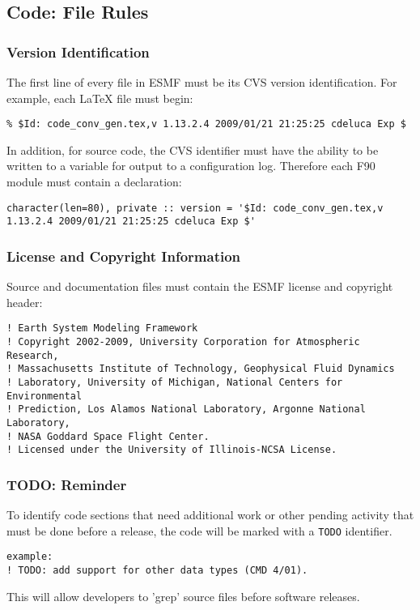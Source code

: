 \subsection{Code: File Rules} 

\subsubsection{Version Identification} 
The first line of every file in ESMF
  must be its CVS version identification. For example, each \LaTeX
  file must begin:
\begin{verbatim}
% $Id: code_conv_gen.tex,v 1.13.2.4 2009/01/21 21:25:25 cdeluca Exp $ 
\end{verbatim}

In addition, for source code, the CVS identifier must have the 
ability to be written to a variable for output to a configuration log.  
Therefore each F90 module must contain a declaration:
\begin{verbatim}
character(len=80), private :: version = '$Id: code_conv_gen.tex,v 1.13.2.4 2009/01/21 21:25:25 cdeluca Exp $'
\end{verbatim}

\subsubsection{License and Copyright Information}

Source and documentation files must contain the ESMF license and 
copyright header:

\begin{verbatim}
! Earth System Modeling Framework
! Copyright 2002-2009, University Corporation for Atmospheric Research,
! Massachusetts Institute of Technology, Geophysical Fluid Dynamics
! Laboratory, University of Michigan, National Centers for Environmental
! Prediction, Los Alamos National Laboratory, Argonne National Laboratory,
! NASA Goddard Space Flight Center.
! Licensed under the University of Illinois-NCSA License.
\end{verbatim}

\subsubsection{TODO: Reminder} 
To identify code sections that need
additional work or other pending activity that must be done before a release,
the code will be marked with a {\tt TODO} identifier. 
\begin{verbatim}
example:
! TODO: add support for other data types (CMD 4/01).
\end{verbatim}
This will allow developers to 'grep' source files before software releases. 

